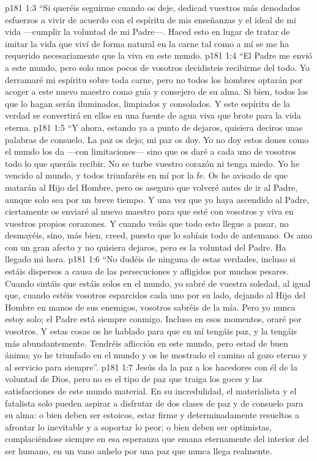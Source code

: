 \vs p181 1:3 “Si queréis seguirme cuando os deje, dedicad vuestros más denodados esfuerzos a vivir de acuerdo con el espíritu de mis enseñanzas y el ideal de mi vida ---cumplir la voluntad de mi Padre---. Haced esto en lugar de tratar de imitar la vida que viví de forma natural en la carne tal como a mí se me ha requerido necesariamente que la viva en este mundo.
\vs p181 1:4 “El Padre me envió a este mundo, pero solo unos pocos de vosotros decidisteis recibirme del todo. Yo derramaré mi espíritu sobre toda carne, pero no todos los hombres optarán por acoger a este nuevo maestro como guía y consejero de su alma. Si bien, todos los que lo hagan serán iluminados, limpiados y consolados. Y este espíritu de la verdad se convertirá en ellos en una fuente de agua viva que brote para la vida eterna.
\vs p181 1:5 “Y ahora, estando ya a punto de dejaros, quisiera deciros unas palabras de consuelo. La paz os dejo; mi paz os doy. Yo no doy estos dones como el mundo los da ---con limitaciones--- sino que os daré a cada uno de vosotros todo lo que queráis recibir. No se turbe vuestro corazón ni tenga miedo. Yo he vencido al mundo, y todos triunfaréis en mí por la fe. Os he avisado de que matarán al Hijo del Hombre, pero os aseguro que volveré antes de ir al Padre, aunque solo sea por un breve tiempo. Y una vez que yo haya ascendido al Padre, ciertamente os enviaré al nuevo maestro para que esté con vosotros y viva en vuestros propios corazones. Y cuando veáis que todo esto llegue a pasar, no desmayéis, sino, más bien, creed, puesto que lo sabíais todo de antemano. Os amo con un gran afecto y no quisiera dejaros, pero es la voluntad del Padre. Ha llegado mi hora.
\vs p181 1:6 “No dudéis de ninguna de estas verdades, incluso si estáis dispersos a causa de las persecuciones y afligidos por muchos pesares. Cuando sintáis que estáis solos en el mundo, yo sabré de vuestra soledad, al igual que, cuando estéis vosotros esparcidos cada uno por su lado, dejando al Hijo del Hombre en manos de sus enemigos, vosotros sabréis de la mía. Pero yo nunca estoy solo; el Padre está siempre conmigo. Incluso en esos momentos, oraré por vosotros. Y estas cosas os he hablado para que en mí tengáis paz, y la tengáis más abundantemente. Tendréis aflicción en este mundo, pero estad de buen ánimo; yo he triunfado en el mundo y os he mostrado el camino al gozo eterno y al servicio para siempre”.
\vs p181 1:7 \pc Jesús da la paz a los hacedores con él de la voluntad de Dios, pero no es el tipo de paz que traiga los goces y las satisfacciones de este mundo material. En su incredulidad, el materialista y el fatalista solo pueden aspirar a disfrutar de dos clases de paz y de consuelo para su alma: o bien deben ser estoicos, estar firme y determinadamente resueltos a afrontar lo inevitable y a soportar lo peor; o bien deben ser optimistas, complaciéndose siempre en esa esperanza que emana eternamente del interior del ser humano, en un vano anhelo por una paz que nunca llega realmente.
